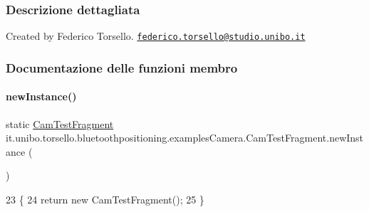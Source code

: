 \subsubsection{Descrizione dettagliata}
Created by Federico Torsello. \href{mailto:federico.torsello@studio.unibo.it}{\tt federico.\+torsello@studio.\+unibo.\+it} 

\subsubsection{Documentazione delle funzioni membro}
\hypertarget{classit_1_1unibo_1_1torsello_1_1bluetoothpositioning_1_1examplesCamera_1_1CamTestFragment_a90560c7d9a436702707f2e070418e0b7_a90560c7d9a436702707f2e070418e0b7}{}\label{classit_1_1unibo_1_1torsello_1_1bluetoothpositioning_1_1examplesCamera_1_1CamTestFragment_a90560c7d9a436702707f2e070418e0b7_a90560c7d9a436702707f2e070418e0b7} 
\paragraph{\texorpdfstring{new\+Instance()}{newInstance()}}
{\footnotesize\ttfamily static \hyperlink{classit_1_1unibo_1_1torsello_1_1bluetoothpositioning_1_1examplesCamera_1_1CamTestFragment}{Cam\+Test\+Fragment} it.\+unibo.\+torsello.\+bluetoothpositioning.\+examples\+Camera.\+Cam\+Test\+Fragment.\+new\+Instance (\begin{DoxyParamCaption}{ }\end{DoxyParamCaption})\hspace{0.3cm}{\ttfamily [static]}}


\begin{DoxyCode}
23                                                 \{
24         \textcolor{keywordflow}{return} \textcolor{keyword}{new} CamTestFragment();
25     \}
\end{DoxyCode}
\hypertarget{classit_1_1unibo_1_1torsello_1_1bluetoothpositioning_1_1examplesCamera_1_1CamTestFragment_a197f76a204aaeac1bfb824c41184d12c_a197f76a204aaeac1bfb824c41184d12c}{}\label{classit_1_1unibo_1_1torsello_1_1bluetoothpositioning_1_1examplesCamera_1_1CamTestFragment_a197f76a204aaeac1bfb824c41184d12c_a197f76a204aaeac1bfb824c41184d12c} 
